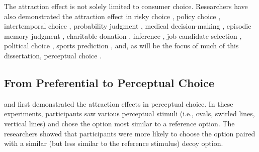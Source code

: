 

The attraction effect is not solely limited to consumer choice. Researchers have also demonstrated the attraction effect in risky choice \parencite{mohr2017attraction}, policy choice \parencite{herneDecoyAlternativesPolicy1997b}, intertemporal choice \parencite{mariniAttractionComesMany2020}, probability judgment \parencite{caiWhenAlternativeHypotheses2023}, medical decision-making \parencite{schwartz1999more}, episodic memory judgment \parencite{maylorSimilarityAttractionEffects2007b}, charitable donation \parencite{pittarello2020three},  inference \parencite{truebloodMultialternativeContextEffects2012}, job candidate selection \parencite{highhouseContextDependentSelectionEffects1996}, political choice \parencite{pan1995attractiovoting}, sports prediction \parencite{fang2024context}, and, as will be the focus of much of this dissertation, perceptual choice \parencite{evansImpactPresentationOrder2021,trueblood2013not, trueblood2015fragile, spektorRepulsionEffectPreferential2022,spektorWhenGoodLooks2018b,yearsleyContextEffectsSimilarity2022,turnerCompetingTheoriesMultialternative2018a,liaoInfluenceDistanceDecoy2021}. 


\subsection{From Preferential to Perceptual Choice}

\textcite{choplinComparisoninducedDecoyEffects2005b} and \textcite{yearsleyContextEffectsSimilarity2022} first demonstrated the attraction effects in perceptual choice. In these experiments, participants saw various perceptual stimuli (i.e., ovals, swirled lines, vertical lines) and chose the option most similar to a reference option. The researchers showed that participants were more likely to choose the option paired with a similar (but less similar to the reference stimulus) decoy option.

